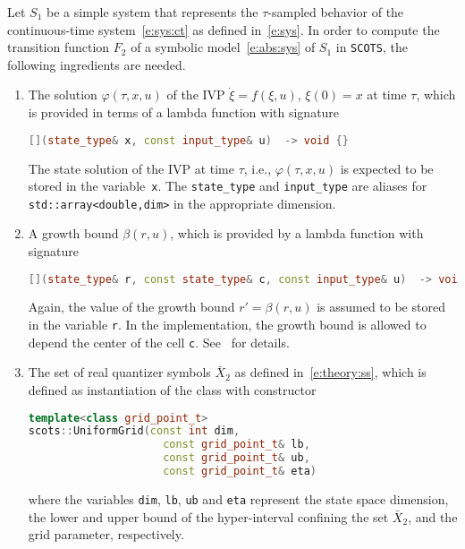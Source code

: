 \documentclass[a4paper]{amsart}
\begin{document}
Let $S_1$ be a simple system that represents the $\tau$-sampled
behavior of the continuous-time system~\eqref{e:sys:ct} as defined in~\eqref{e:sys}.
In order to compute the transition function $F_2$ of a symbolic
model~\eqref{e:abs:sys} of $S_1$ in {\tt SCOTS}, the following ingredients are
needed.
\begin{enumerate}
  \item The solution $\varphi(\tau,x,u)$ of the IVP $\dot \xi = f(\xi,u)$,
  $\xi(0)=x$ at time $\tau$, which is provided in terms of a lambda function
  with signature 
\begin{lstlisting}[basicstyle=\small\ttfamily, language=C++]
[](state_type& x, const input_type& u)  -> void {}
\end{lstlisting}
  The state solution of the IVP at time $\tau$, i.e., $\varphi(\tau,x,u)$ is
  expected to be stored in the variable~{\tt x}. The {\tt state\_type} and
  {\tt\small input\_type} are aliases for {\tt\small std::array<double,dim>} in the appropriate
  dimension.

  \item A growth bound $\beta(r,u)$, which is provided by a lambda function with
  signature 
\begin{lstlisting}[basicstyle=\small\ttfamily, language=C++]
[](state_type& r, const state_type& c, const input_type& u)  -> void {}
\end{lstlisting}
  Again, the value of the growth bound $r'=\beta(r,u)$ is assumed to be stored
  in the variable {\tt r}. In the implementation, the growth bound is allowed
  to depend the center of the cell {\tt c}. See~\cite{WeberRunggerReissig17} for
  details.

  \item The set of real quantizer symbols $\bar X_2$ as defined
  in~\eqref{e:theory:ss}, which is defined as instantiation of the class with constructor
\begin{lstlisting}[basicstyle=\small\ttfamily, language=C++]
template<class grid_point_t>
scots::UniformGrid(const int dim,
                     const grid_point_t& lb,
                     const grid_point_t& ub,
                     const grid_point_t& eta)
\end{lstlisting}
  where the variables {\tt dim}, {\tt lb}, {\tt ub} and {\tt eta} represent the
  state space dimension, the lower and upper bound of the hyper-interval
  confining the set $\bar X_2$, and the grid parameter, respectively.


\end{enumerate}
\end{document}
